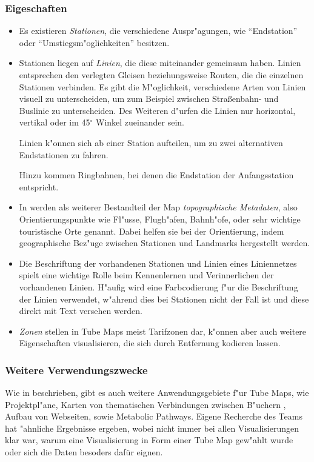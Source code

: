 \subsubsection{Eigeschaften}
\begin{itemize}
\item Es existieren \emph{Stationen}, die verschiedene Auspr"agungen, wie "`Endstation"' oder "`Umstiegsm"oglichkeiten"' besitzen. 

\item Stationen liegen auf \emph{Linien}, die diese miteinander gemeinsam haben. Linien entsprechen den verlegten Gleisen beziehungsweise Routen, die die einzelnen Stationen verbinden. Es gibt die M"oglichkeit, verschiedene Arten von Linien visuell zu unterscheiden, um zum Beispiel zwischen Stra\ss enbahn- und Buslinie zu unterscheiden. Des Weiteren d"urfen die Linien nur horizontal, vertikal oder im 45$^{\circ}$ Winkel zueinander sein. 

Linien k"onnen sich ab einer Station aufteilen, um zu zwei alternativen Endstationen zu fahren. 

Hinzu kommen Ringbahnen, bei denen die Endstation der Anfangsstation entspricht.

\item In \cite{automaticlayoutmetro08} werden als weiterer Bestandteil der Map \emph{topographische Metadaten}, also Orientierungspunkte wie Fl"usse, Flugh"afen, Bahnh"ofe, oder sehr wichtige touristische Orte genannt. Dabei helfen sie bei der Orientierung, indem geographische Bez"uge zwischen Stationen und Landmarks hergestellt werden.

\item Die Beschriftung der vorhandenen Stationen und Linien eines Liniennetzes spielt eine wichtige Rolle beim Kennenlernen und Verinnerlichen der vorhandenen Linien. H"aufig wird eine Farbcodierung f"ur die Beschriftung der Linien verwendet, w"ahrend dies bei Stationen nicht der Fall ist und diese direkt mit Text versehen werden. 

\item \emph{Zonen} stellen in Tube Maps meist Tarifzonen dar, k"onnen aber auch weitere Eigenschaften visualisieren, die sich durch Entfernung kodieren lassen. 
\end{itemize}

\subsubsection{Weitere Verwendungszwecke}
\label{tm:verwendungszwecke}
Wie in \cite{automaticlayoutmetro08} beschrieben, gibt es auch weitere Anwendungsgebiete f"ur Tube Maps, wie Projektpl"ane, Karten von thematischen Verbindungen zwischen B"uchern \cite{oreilly}, Aufbau von Webseiten, sowie Metabolic Pathways. Eigene Recherche des Teams hat "ahnliche Ergebnisse ergeben, wobei nicht immer bei allen Visualisierungen klar war, warum eine Visualisierung in Form einer Tube Map gew"ahlt wurde oder sich die Daten besoders dafür eignen.

